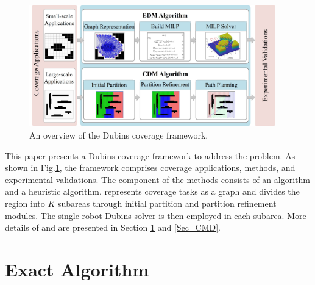 \documentclass[journal,article,submit,pdftex,moreauthors]{Definitions/mdpi}
\begin{document}
\begin{figure}[bp] %
	\centering  %
    \vspace{0 cm} %
    \includegraphics[width=0.95\textwidth]{10.jpg}
    \caption{ An overview of the Dubins coverage framework.}
   \label{Fig_framework}
\end{figure}

This paper presents a Dubins coverage framework to address the  problem. As shown in Fig.\ref{Fig_framework}, the framework comprises coverage applications,  methods, and experimental validations. The component of the  methods consists of an  algorithm and a heuristic  algorithm.  represents coverage tasks as a graph and   divides the region into $K$ subareas through initial partition and partition refinement modules. The single-robot Dubins solver \cite{c25} is then employed in each subarea. More details of  and  are presented in Section \ref{Sec_EMD} and \ref{Sec_CMD}.

\section{Exact  Algorithm}
\label{Sec_EMD}
\end{document}

